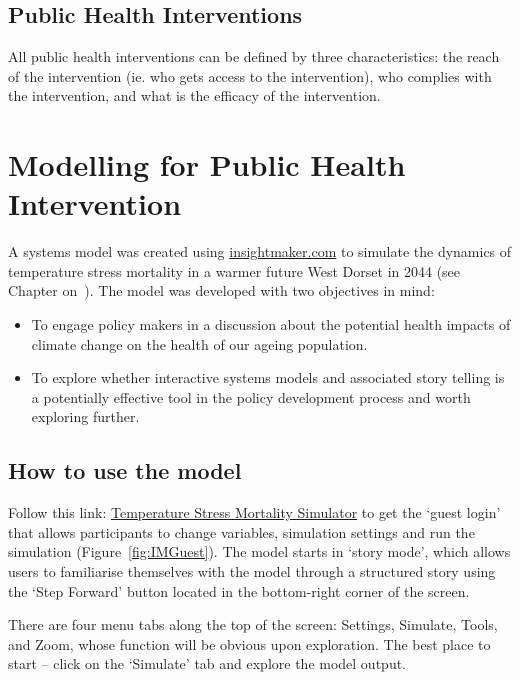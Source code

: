 \subsection{Public Health Interventions}
All public health interventions can be defined by three characteristics: the reach of the intervention (ie. who gets access to the intervention), who complies with the intervention, and what is the efficacy of the intervention.


\section{Modelling for Public Health Intervention}



A systems model was created using \url{insightmaker.com} to simulate the dynamics of temperature stress mortality in a warmer future West Dorset in 2044 (see Chapter on~). The model was developed with two objectives in mind:
\begin{itemize}
	\item To engage policy makers in a discussion about the potential health impacts of climate change on the health of our ageing population.
	\item To explore whether interactive systems models and associated story telling is a potentially effective tool in the policy development process and worth exploring further.
\end{itemize}

\subsection{How to use the model}
Follow this link: \href{https://insightmaker.com/insight/33655/Temperature-Stress-Mortality-Simulator}{Temperature Stress Mortality Simulator} to get the `guest login' that allows participants to change variables, simulation settings and run the simulation (Figure~\ref{fig:IMGuest}). The model starts in `story mode', which allows users to familiarise themselves with the model through a structured story using the `Step Forward' button located in the bottom-right corner of the screen.

There are four menu tabs along the top of the screen: Settings, Simulate, Tools, and Zoom, whose function will be obvious upon exploration. The best place to start -- click on the `Simulate' tab and explore the model output.


